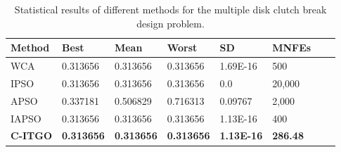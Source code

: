 
\begin{table*}[tp]
    \tiny
    \begin{center}
    
    \begin{tabular}{ P{2.0cm} P{2.0cm} P{2.0cm} P{2.0cm} P{2.0cm} P{2.0cm} P{2.0cm} P{2.0cm}  }
    \hline
    \textbf{Method} & \textbf{Best} & \textbf{Mean} & \textbf{Worst} & \textbf{SD} & \textbf{MNFEs} \\
    \hline

    WCA & 0.313656 & 0.313656 & 0.313656 & 1.69E-16 & 500 \\
    IPSO & 0.313656 & 0.313656 & 0.313656 & 0.0 & 20,000 \\
    APSO & 0.337181 & 0.506829 & 0.716313 & 0.09767 & 2,000 \\    
    IAPSO & 0.313656 & 0.313656 & 0.313656 & 1.13E-16 & 400 \\
    \textbf{C-ITGO} & \bf{0.313656} & \bf{0.313656} & \bf{0.313656} & \bf{1.13E-16} & \bf{286.48} \\

    \hline
    \end{tabular}
    \end{center}
    \vspace*{-6mm}
    \caption{Statistical results of different methods for the multiple disk clutch break design problem. \\[1em]}
    \label{tab:MD}
    \end{table*}
    
    